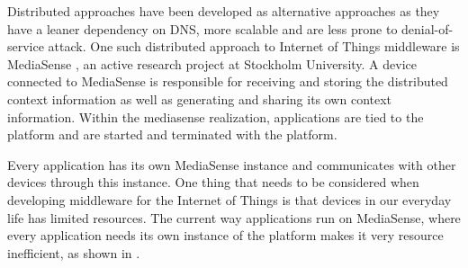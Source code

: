 Distributed approaches have been developed as alternative approaches as they have a leaner dependency on DNS, more scalable and are less prone to denial-of-service attack. One such distributed approach to Internet of Things middleware is MediaSense \cite{Kanter539187}, an active research project at Stockholm University. A device connected to MediaSense is responsible for receiving and storing the distributed context information as well as generating and sharing its own context information. Within the mediasense realization, applications are tied to the platform and are started and terminated with the platform. 

Every application has its own MediaSense instance and communicates with other devices through this instance. One thing that needs to be considered when developing middleware for the  Internet of Things is that devices in our everyday life has limited resources. The current way applications run on MediaSense, where every application needs its own instance of the platform makes it very resource inefficient, as shown in \cite{tab:test_table}.